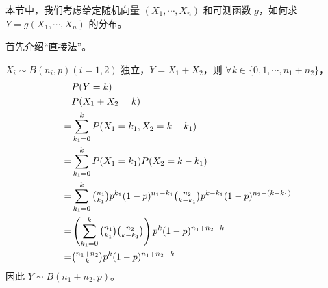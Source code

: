 \documentclass[../main.tex]{subfiles}
\begin{document}
本节中，我们考虑给定随机向量 $(X_1,\cdots,X_n)$ 和可测函数 $g$，如何求 $Y=g(X_1,\cdots,X_n)$ 的分布。

首先介绍“直接法”。

\begin{example}
    $X_i\sim B(n_i,p)(i=1,2)$ 独立，$Y=X_1+X_2$，则 $\forall k\in\{0,1,\cdots,n_1+n_2\}$，
    \begin{equation*}
        \begin{aligned}
              & P(Y=k)                                                                                               \\
            = & P(X_1+X_2=k)                                                                                         \\
            = & \sum_{k_1=0}^kP(X_1=k_1,X_2=k-k_1)                                                                   \\
            = & \sum_{k_1=0}^kP(X_1=k_1)P(X_2=k-k_1)                                                                 \\
            = & \sum_{k_1=0}^k\tbinom{n_1}{k_1}p^{k_1}(1-p)^{n_1-k_1}\tbinom{n_2}{k-k_1}p^{k-k_1}(1-p)^{n_2-(k-k_1)} \\
            = & \left(\sum_{k_1=0}^k\tbinom{n_1}{k_1}\tbinom{n_2}{k-k_1}\right)p^k(1-p)^{n_1+n_2-k}                  \\
            = & \tbinom{n_1+n_2}{k}p^k(1-p)^{n_1+n_2-k}
        \end{aligned}
    \end{equation*}
    因此 $Y\sim B(n_1+n_2,p)$。
\end{example}
\end{document}
